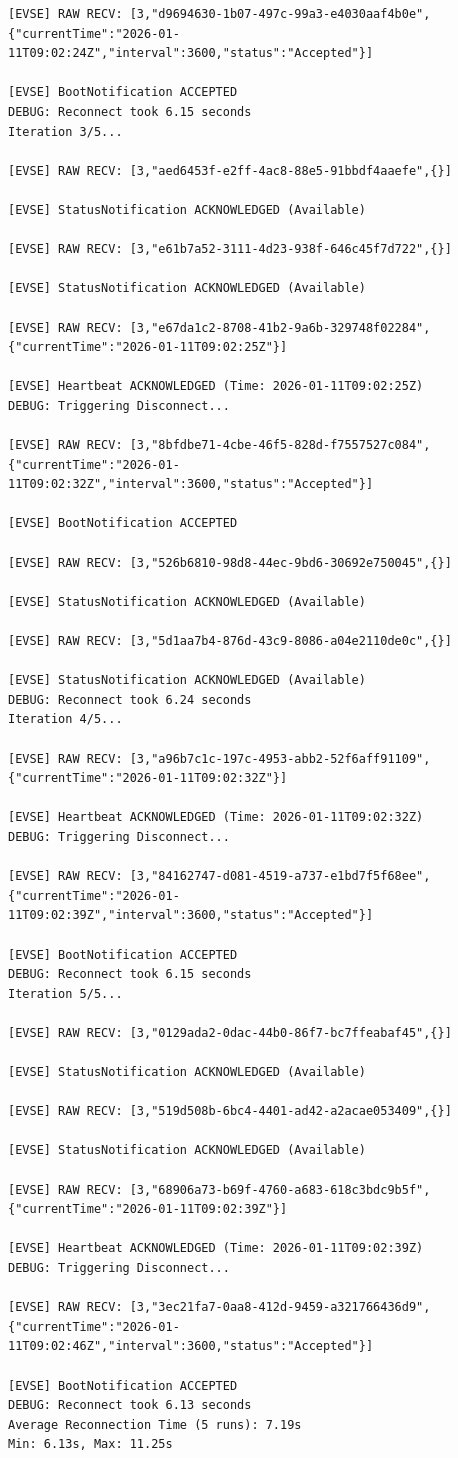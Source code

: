 \documentclass{article}
\begin{document}
\begin{lstlisting}
[EVSE] RAW RECV: [3,"d9694630-1b07-497c-99a3-e4030aaf4b0e",{"currentTime":"2026-01-11T09:02:24Z","interval":3600,"status":"Accepted"}]

[EVSE] BootNotification ACCEPTED
DEBUG: Reconnect took 6.15 seconds
Iteration 3/5...

[EVSE] RAW RECV: [3,"aed6453f-e2ff-4ac8-88e5-91bbdf4aaefe",{}]

[EVSE] StatusNotification ACKNOWLEDGED (Available)

[EVSE] RAW RECV: [3,"e61b7a52-3111-4d23-938f-646c45f7d722",{}]

[EVSE] StatusNotification ACKNOWLEDGED (Available)

[EVSE] RAW RECV: [3,"e67da1c2-8708-41b2-9a6b-329748f02284",{"currentTime":"2026-01-11T09:02:25Z"}]

[EVSE] Heartbeat ACKNOWLEDGED (Time: 2026-01-11T09:02:25Z)
DEBUG: Triggering Disconnect...

[EVSE] RAW RECV: [3,"8bfdbe71-4cbe-46f5-828d-f7557527c084",{"currentTime":"2026-01-11T09:02:32Z","interval":3600,"status":"Accepted"}]

[EVSE] BootNotification ACCEPTED

[EVSE] RAW RECV: [3,"526b6810-98d8-44ec-9bd6-30692e750045",{}]

[EVSE] StatusNotification ACKNOWLEDGED (Available)

[EVSE] RAW RECV: [3,"5d1aa7b4-876d-43c9-8086-a04e2110de0c",{}]

[EVSE] StatusNotification ACKNOWLEDGED (Available)
DEBUG: Reconnect took 6.24 seconds
Iteration 4/5...

[EVSE] RAW RECV: [3,"a96b7c1c-197c-4953-abb2-52f6aff91109",{"currentTime":"2026-01-11T09:02:32Z"}]

[EVSE] Heartbeat ACKNOWLEDGED (Time: 2026-01-11T09:02:32Z)
DEBUG: Triggering Disconnect...

[EVSE] RAW RECV: [3,"84162747-d081-4519-a737-e1bd7f5f68ee",{"currentTime":"2026-01-11T09:02:39Z","interval":3600,"status":"Accepted"}]

[EVSE] BootNotification ACCEPTED
DEBUG: Reconnect took 6.15 seconds
Iteration 5/5...

[EVSE] RAW RECV: [3,"0129ada2-0dac-44b0-86f7-bc7ffeabaf45",{}]

[EVSE] StatusNotification ACKNOWLEDGED (Available)

[EVSE] RAW RECV: [3,"519d508b-6bc4-4401-ad42-a2acae053409",{}]

[EVSE] StatusNotification ACKNOWLEDGED (Available)

[EVSE] RAW RECV: [3,"68906a73-b69f-4760-a683-618c3bdc9b5f",{"currentTime":"2026-01-11T09:02:39Z"}]

[EVSE] Heartbeat ACKNOWLEDGED (Time: 2026-01-11T09:02:39Z)
DEBUG: Triggering Disconnect...

[EVSE] RAW RECV: [3,"3ec21fa7-0aa8-412d-9459-a321766436d9",{"currentTime":"2026-01-11T09:02:46Z","interval":3600,"status":"Accepted"}]

[EVSE] BootNotification ACCEPTED
DEBUG: Reconnect took 6.13 seconds
Average Reconnection Time (5 runs): 7.19s
Min: 6.13s, Max: 11.25s

\end{lstlisting}
\end{document}
